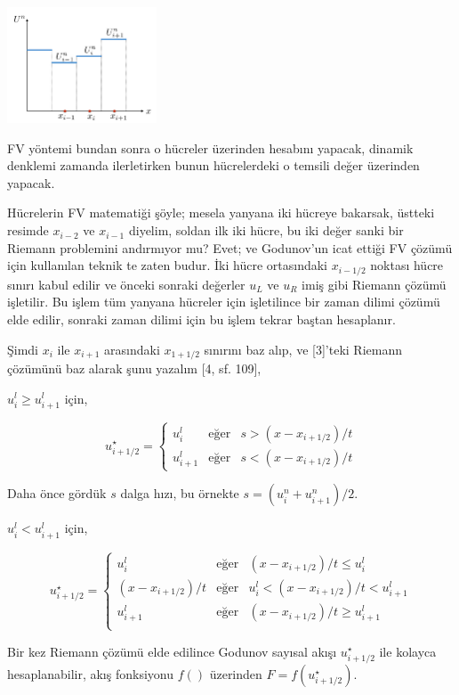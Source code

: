 \documentclass[12pt,fleqn]{article}\usepackage{../../common}
\begin{document}
\includegraphics[width=12em]{12-19-02.png}

FV yöntemi bundan sonra o hücreler üzerinden hesabını yapacak, dinamik denklemi
zamanda ilerletirken bunun hücrelerdeki o temsili değer üzerinden yapacak.

Hücrelerin FV matematiği şöyle; mesela yanyana iki hücreye bakarsak, üstteki
resimde $x_{i-2}$ ve $x_{i-1}$ diyelim, soldan ilk iki hücre, bu iki değer sanki
bir Riemann problemini andırmıyor mu? Evet; ve Godunov'un icat ettiği FV çözümü
için kullanılan teknik te zaten budur. İki hücre ortasındaki $x_{i-1/2}$ noktası
hücre sınırı kabul edilir ve önceki sonraki değerler $u_L$ ve $u_R$ imiş gibi
Riemann çözümü işletilir. Bu işlem tüm yanyana hücreler için işletilince bir
zaman dilimi çözümü elde edilir, sonraki zaman dilimi için bu işlem tekrar
baştan hesaplanır.

Şimdi $x_{i}$ ile $x_{i+1}$ arasındaki $x_{1+1/2}$ sınırını baz alıp, ve
[3]'teki Riemann çözümünü baz alarak şunu yazalım [4, sf. 109],

$u_i^l \ge u_{i+1}^l$ için,

$$
u^\star_{i+1/2} = 
\left\{ \begin{array}{lll}
u_i^l & \textrm{eğer} & s > (x-x_{i+1/2}) / t  \\
u_{i+1}^l & \textrm{eğer} & s < (x-x_{i+1/2}) / t
\end{array} \right.
$$

Daha önce gördük $s$ dalga hızı, bu örnekte $s = (u_i^n + u_{i+1}^n)/2$.

$u_i^l < u_{i+1}^l$ için,

$$
u^\star_{i+1/2} = 
\left\{ \begin{array}{lll}
u_i^l & \textrm{eğer} & (x-x_{i+1/2})/t \le u_i^l   \\
(x-x_{i+1/2})/t & \textrm{eğer} & u_i^l < (x-x_{i+1/2})/t < u_{i+1}^l   \\
u_{i+1}^l & \textrm{eğer} & (x-x_{i+1/2})/t \ge u_{i+1}^l   \\
\end{array} \right.
$$

Bir kez Riemann çözümü elde edilince Godunov sayısal akışı $u^\star_{i+1/2}$ ile
kolayca hesaplanabilir, akış fonksiyonu $f()$ üzerinden $F = f(u^\star_{i+1/2})$.
\end{document}
